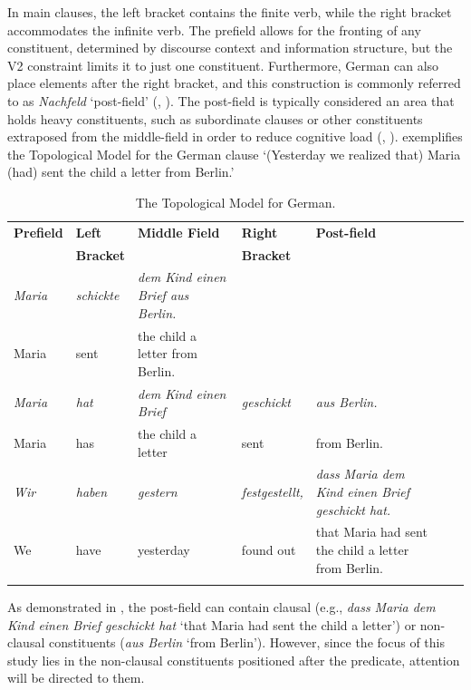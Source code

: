 In main clauses, the left bracket contains the finite verb, while the right bracket accommodates the infinite verb. The prefield allows for the fronting of any constituent, determined by discourse context and information structure, but the V2 constraint limits it to just one constituent. Furthermore, German can also place elements after the right bracket, and this construction is commonly referred to as \textit{Nachfeld} ‘post-field’ (\citealt{Frey2015}, \citealt{Hartmann2017}). The post-field is typically considered an area that holds heavy constituents, such as subordinate clauses or other constituents extraposed from the middle-field in order to reduce cognitive load (\citealt{Imo2015}, \citealt{Proske2015}).  exemplifies the Topological Model for the German clause ‘(Yesterday we realized that) Maria (had) sent the child a letter from Berlin.’

\largerpage[3]
\begin{table}[b]\small
\begin{tabularx}{.95\textwidth}{llXlXlX}
\lsptoprule
\textbf{Prefield}  & \textbf{Left} & \textbf{Middle Field}  & \textbf{Right} & \textbf{Post-field}\\
& \textbf{Bracket} &  & \textbf{Bracket} & \\
\midrule
\textit{Maria} & \textit{schickte} & \textit{dem Kind einen Brief aus Berlin.} & &\\
Maria & sent & the child a letter from Berlin. &  & \\
\midrule
\textit{Maria} & \textit{hat} & \textit{dem Kind einen Brief} & \textit{geschickt} & \textit{aus Berlin.}\\
Maria & has & the child a letter & sent & from Berlin. \\
\midrule
\textit{Wir} & \textit{haben} & \textit{gestern} & \textit{festgestellt,} & \textit{dass Maria dem Kind einen Brief geschickt hat.} \\
We & have & yesterday & found out & that Maria had sent the child a letter from Berlin. &  \\
\lspbottomrule
\end{tabularx}
\caption{\label{tab:key:3.1} The Topological Model for German.}
\end{table}

As demonstrated in , the post-field can contain clausal (e.g., \textit{dass Maria dem Kind einen Brief geschickt hat} ‘that Maria had sent the child a letter’) or non-clausal constituents (\textit{aus Berlin} ‘from Berlin’). However, since the focus of this study lies in the non-clausal constituents positioned after the predicate, attention will be directed to them.

